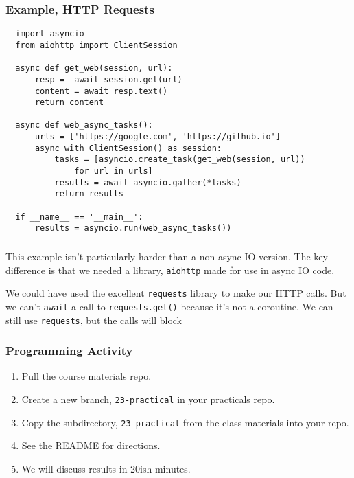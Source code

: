 \documentclass[10pt]{beamer}
\begin{document}
 
\begin{frame}[fragile]
  \frametitle{Example, HTTP Requests}
  
  \begin{verbatim}
  import asyncio
  from aiohttp import ClientSession

  async def get_web(session, url):
      resp =  await session.get(url)
      content = await resp.text()
      return content

  async def web_async_tasks():
      urls = ['https://google.com', 'https://github.io']
      async with ClientSession() as session:
          tasks = [asyncio.create_task(get_web(session, url)) 
              for url in urls]
          results = await asyncio.gather(*tasks)
          return results

  if __name__ == '__main__':
      results = asyncio.run(web_async_tasks())
  \end{verbatim}
    
  \end{frame}
  
\begin{frame}
  \frametitle{}
  

  This example isn't particularly harder than a non-async IO version. The
  key difference is that we needed a  library, \texttt{aiohttp} made for use
  in async IO code.
  
  \vspace{5mm}
  We could have used the excellent \texttt{requests} library to make our HTTP
  calls. But we can't \texttt{await} a call to \texttt{requests.get()} because
  it's not a coroutine. We can still use \texttt{requests}, but the calls will
  block

  \end{frame}

\begin{frame}
  \frametitle{Programming Activity}
  
  \begin{enumerate}
    \item Pull the course materials repo.
    \item Create a new branch, \texttt{23-practical} in your practicals repo.
    \item Copy the subdirectory, \texttt{23-practical} from the class materials into your repo.
    \item See the README for directions.
    \item We will discuss results in 20ish minutes.
  \end{enumerate}      
\end{frame}
  
\end{document}
